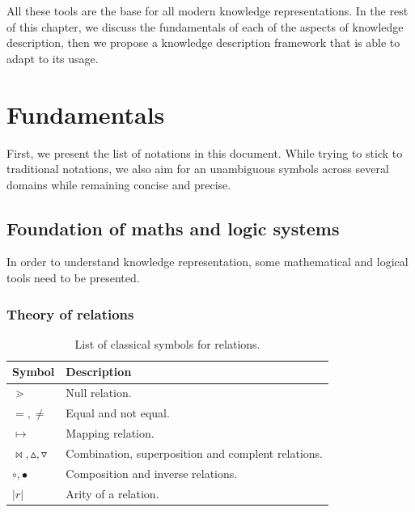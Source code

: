 \documentclass[11pt,a4paper,twoside,openright,titlepage,numbers=noenddot,headinclude,cleardoublepage=empty,openany]{scrreprt}
\theoremstyle{plain}
\theoremstyle{definition}
\theoremstyle{remark}
\begin{document}
All these tools are the base for all modern knowledge representations.
In the rest of this chapter, we discuss the fundamentals of each of the
aspects of knowledge description, then we propose a knowledge
description framework that is able to adapt to its usage.

\hypertarget{fundamentals}{%
\section{Fundamentals}\label{fundamentals}}

First, we present the list of notations in this document. While trying
to stick to traditional notations, we also aim for an unambiguous
symbols across several domains while remaining concise and precise.

\hypertarget{foundation-of-maths-and-logic-systems}{%
\subsection{Foundation of maths and logic
systems}\label{foundation-of-maths-and-logic-systems}}

In order to understand knowledge representation, some mathematical and
logical tools need to be presented.

\hypertarget{theory-of-relations}{%
\subsubsection{Theory of relations}\label{theory-of-relations}}

\hypertarget{tbl:relation}{}
\begin{table}\footnotesize
\centering

\caption{\label{tbl:relation}List of classical symbols for relations.}

\begin{tabular}{@{}ll@{}}
\toprule

\textbf{Symbol} & \textbf{Description} \\\midrule

\(\gtrdot\) & Null relation. \\
\(=, \neq\) & Equal and not equal. \\
\(\mapsto\) & Mapping relation. \\
\(\bowtie, \vartriangle, \triangledown\) & Combination, superposition
and complent relations. \\
\(\circ, \bullet\) & Composition and inverse relations. \\
\(|r|\) & Arity of a relation. \\

\bottomrule
\end{tabular}

\end{table}
\end{document}
